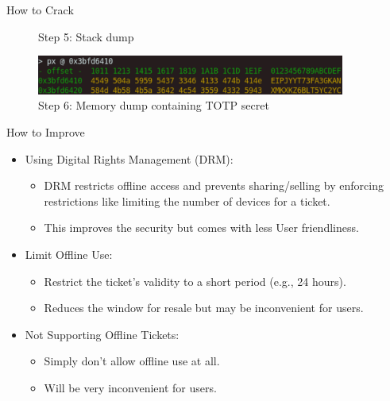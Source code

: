 \documentclass[final,dvipsnames]{beamer}
\newlength{\sepwidth}
\newlength{\colwidth}
\newcommand{\separatorcolumn}{\begin{column}{\sepwidth}\end{column}}
\begin{document}
\begin{frame}[t, fragile]
\begin{columns}[t]
\begin{column}{\colwidth}
\begin{block}{How to Crack}
\begin{figure}[h]
            \caption{Step 5: Stack dump}
            \label{fig:HackingStep5}
        \end{figure}
        \begin{figure}[h]
            \centering
            \includegraphics[width=0.95\textwidth]{figures/Hacking_step_6.png}
            \caption{Step 6: Memory dump containing TOTP secret}
            \label{fig:HackingStep6}
        \end{figure}
        
    \end{block}
    \begin{block}{How to Improve}
        \begin{itemize}
            \item Using Digital Rights Management (DRM):
            \begin{itemize}
                \item DRM restricts offline access and prevents sharing/selling by enforcing restrictions like limiting the number of devices for a ticket.
                \item This improves the security but comes with less User friendliness.
            \end{itemize}
            \item Limit Offline Use:
            \begin{itemize}
                \item Restrict the ticket’s validity to a short period (e.g., 24 hours). 
                \item Reduces the window for resale but may be inconvenient for users.
            \end{itemize}
            \item Not Supporting Offline Tickets:
            \begin{itemize}
                \item Simply don't allow offline use at all.
                \item Will be very inconvenient for users.
            \end{itemize}
        \end{itemize}
    \end{block}
    

\end{column}




\separatorcolumn
\end{columns}
\end{frame}
\end{document}
